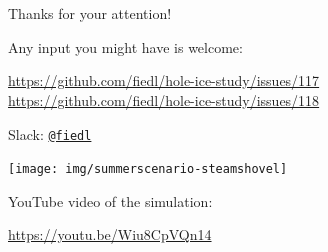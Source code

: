 \section{}
\begin{frame}[fragile]{Thanks for your attention!}
  \begin{center}
  Any input you might have is welcome: \\ \vspace{0.3cm}

  \url{https://github.com/fiedl/hole-ice-study/issues/117} \\
  \url{https://github.com/fiedl/hole-ice-study/issues/118} \\ \vspace{0.1cm}

  Slack:
  \href{https://icecube-spno.slack.com/messages/@U092MBFU2}{\texttt{@fiedl}}

  \vspace{1.5cm}

  \texttt{[image: img/summerscenario-steamshovel]}

  YouTube video of the simulation:

  \url{https://youtu.be/Wiu8CpVQn14}

  \end{center}
\end{frame}